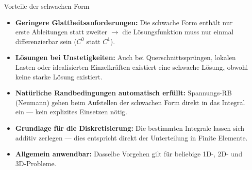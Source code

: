 \documentclass[aspectratio=169,professionalfonts]{beamer}
\begin{document}
\begin{frame}{Vorteile der schwachen Form}
  \small
  \begin{itemize}
    \item \textbf{Geringere Glattheitsanforderungen:} Die schwache Form enthält nur erste Ableitungen statt zweiter $\rightarrow$ die Lösungsfunktion muss nur einmal differenzierbar sein ($C^0$ statt $C^1$).
    \vspace{0.3em}
    \item \textbf{Lösungen bei Unstetigkeiten:} Auch bei Querschnittssprüngen, lokalen Lasten oder idealisierten Einzelkräften existiert eine schwache Lösung, obwohl keine starke Lösung existiert.
    \vspace{0.3em}
    \item \textbf{Natürliche Randbedingungen automatisch erfüllt:} Spannungs-RB (Neumann) gehen beim Aufstellen der schwachen Form direkt in das Integral ein — kein explizites Einsetzen nötig.
    \vspace{0.3em}
    \item \textbf{Grundlage für die Diskretisierung:} Die bestimmten Integrale lassen sich additiv zerlegen — dies entspricht direkt der Unterteilung in Finite Elemente.
    \vspace{0.3em}
    \item \textbf{Allgemein anwendbar:} Dasselbe Vorgehen gilt für beliebige 1D-, 2D- und 3D-Probleme.
  \end{itemize}
\end{frame}
\end{document}
